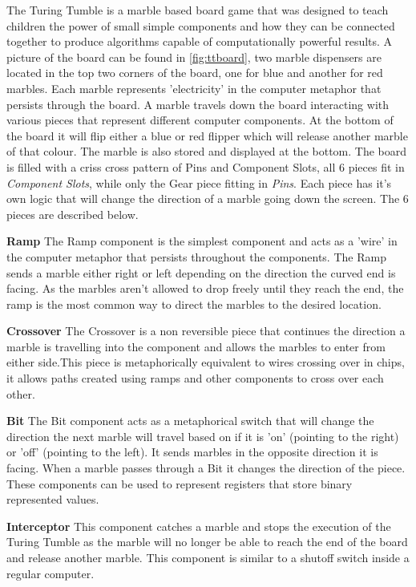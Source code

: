 \documentclass{l4proj}
\begin{document}
The Turing Tumble is a marble based board game that was designed to teach children the power of small simple components and how they can be connected together to produce algorithms capable of computationally powerful results. A picture of the board can be found in \ref{fig:ttboard}, two marble dispensers are located in the top two corners of the board, one for blue and another for red marbles. Each marble represents 'electricity' in the computer metaphor that persists through the board. A marble travels down the board interacting with various pieces that represent different computer components. At the bottom of the board it will flip either a blue or red flipper which will release another marble of that colour. The marble is also stored and displayed at the bottom. The board is filled with a criss cross pattern of Pins and Component Slots, all 6 pieces fit in \emph{Component Slots}, while only the Gear piece fitting in \emph{Pins}. Each piece has it's own logic that will change the direction of a marble going down the screen. The 6 pieces are described below.

\textbf{Ramp}
The Ramp component is the simplest component and acts as a 'wire' in the computer metaphor that persists throughout the components. The Ramp sends a marble either right or left depending on the direction the curved end is facing. As the marbles aren't allowed to drop freely until they reach the end, the ramp is the most common way to direct the marbles to the desired location.

\textbf{Crossover}
The Crossover is a non reversible piece that continues the direction a marble is travelling into the component and allows the marbles to enter from either side.This piece is metaphorically equivalent to wires crossing over in chips, it allows paths created using ramps and other components to cross over each other.

\textbf{Bit}
The Bit component acts as a metaphorical switch that will change the direction the next marble will travel based on if it is 'on' (pointing to the right) or 'off' (pointing to the left). It sends marbles in the opposite direction it is facing. When a marble passes through a Bit it changes the direction of the piece. These components can be used to represent registers that store binary represented values.

\textbf{Interceptor}
This component catches a marble and stops the execution of the Turing Tumble as the marble will no longer be able to reach the end of the board and release another marble. This component is similar to a shutoff switch inside a regular computer. 
\end{document}

